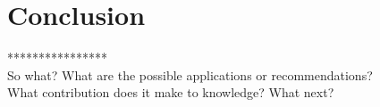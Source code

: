 \label{chapter-conclusion}
\chapter{Conclusion}

****************\\
So what? What are the possible applications or recommendations?\\
What contribution does it make to knowledge? What next?\\

